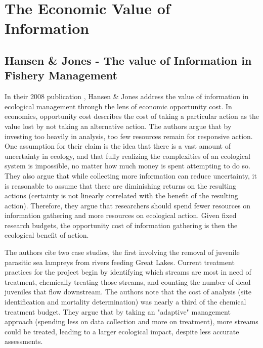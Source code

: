 \section{The Economic Value of Information}
\subsection{Hansen \& Jones - The value of Information in Fishery Management}
In their 2008 publication \cite{Hansen2008}, Hansen \& Jones address the value of information in ecological management through the lens of economic opportunity cost.  In economics, opportunity cost describes the cost of taking a particular action as the value lost by not taking an alternative action.  The authors argue that by investing too heavily in analysis, too few resources remain for responsive action.  One assumption for their claim is the idea that there is a vast amount of uncertainty in ecology, and that fully realizing the complexities of an ecological system is impossible, no matter how much money is spent attempting to do so.  They also argue that while collecting more information can reduce uncertainty, it is reasonable to assume that there are diminishing returns on the resulting actions (certainty is not linearly correlated with the benefit of the resulting action).  Therefore, they argue that researchers should spend fewer resources on information gathering and more resources on ecological action.  Given fixed research budgets, the opportunity cost of information gathering is then the ecological benefit of action.  

The authors cite two case studies, the first involving the removal of juvenile parasitic sea lampreys from rivers feeding Great Lakes.  Current treatment practices for the project begin by identifying which streams are most in need of treatment, chemically treating those streams, and counting the number of dead juveniles that flow downstream.  The authors note that the cost of analysis (site identification and mortality determination) was nearly a third of the chemical treatment budget.  They argue that by taking an "adaptive" management approach (spending less on data collection and more on treatment), more streams could be treated, leading to a larger ecological impact, despite less accurate assessments.

